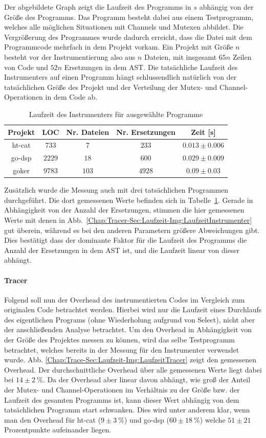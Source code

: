 Der abgebildete Graph zeigt die Laufzeit des Programms in $s$ abhängig von der 
Größe des Programms. Das Programm besteht dabei aus einem Testprogramm, welches 
alle möglichen Situationen mit Channels und Mutexen abbildet. Die Vergrößerung 
des Programmes wurde dadurch erreicht, dass die Datei mit dem Programmcode 
mehrfach in dem Projekt vorkam. Ein Projekt mit Größe $n$ besteht vor der 
Instrumentierung also 
aus $n$ Dateien, mit insgesamt $65n$ Zeilen von Code und $52n$ Ersetzungen
in dem AST. Die tatsächliche Laufzeit des Instrumenters auf einen 
Programm hängt schlussendlich natürlich von der tatsächlichen Größe des 
Projekt und der Verteilung der Mutex- und Channel-Operationen in dem Code ab.\\
\begin{table}[!h]
  \centering
  \begin{tabular}{|c|c|c|c|c|}
  \hline
  Projekt & LOC & Nr. Dateien & Nr. Ersetzungen & Zeit {[}s{]} \\ \hline
  ht-cat & $733$ & $7$ & $233$ & $0.013 \pm 0.006$ \\ \hline
  go-dsp & $2229$ & $18$ & $600$ & $0.029 \pm 0.009$ \\ \hline
  goker & $9783$ & $103$ & $4928$ & $0.09 \pm 0.03$ \\ \hline
  \end{tabular}
  \caption{Laufzeit des Instrumenters für ausgewählte Programme}
  \label{Chap:Tracer-Sec:Laufzeit-Tab:LaufzeitInstrumenter}
\end{table}
Zusätzlich wurde die Messung auch mit drei tatsächlichen Programmen 
durchgeführt. Die dort gemessenen Werte befinden sich in 
Tabelle~\ref{Chap:Tracer-Sec:Laufzeit-Tab:LaufzeitInstrumenter}. Gerade in 
Abhängigkeit von der Anzahl der Ersetzungen, stimmen die hier gemessenen Werte
mit denen in Abb.~\ref{Chap:Tracer-Sec:Laufzeit-Img:LaufzeitInstrumenter} gut 
überein, während es bei den anderen Parametern größere Abweichungen gibt.
Dies bestätigt dass der dominante Faktor für die Laufzeit des Programms 
die Anzahl der Ersetzungen in dem AST ist, und die Laufzeit linear von dieser 
abhängt.
\paragraph{Tracer} Folgend soll nun der Overhead des instrumentierten Codes 
im Vergleich zum originalen Code betrachtet werden.
Hierbei wird nur die Laufzeit eines Durchlaufs des eigentlichen Programs
(ohne Wiederholung aufgrund von Select), 
nicht aber der anschließenden 
Analyse betrachtet. Um den Overhead in Abhängigkeit von der Größe des Projektes messen 
zu können, wird das selbe Testprogramm betrachtet, welches bereits in der Messung 
für den Instrumenter verwendet wurde. Abb. \ref{Chap:Trace-Sec:Laufzeit-Img:LaufzeitTracer}
zeigt den gemessenen Overhead. Der durchschnittliche Overhead über alle gemessenen Werte 
liegt dabei bei $14 \pm 2\ \%$. Da der Overhead aber linear davon abhängt, 
wie groß der Anteil der Mutex- und Channel-Operationen im Verhältnis zu 
der Größe bzw. der Laufzeit des gesamten Programms ist, kann dieser Wert abhängig 
von dem tatsächlichen Programm start schwanken. Dies wird unter anderem klar, wenn man 
den Overhead für ht-cat ($9 \pm 3\ \%$) und go-dsp ($60\pm 18\ \%$) welche $51 \pm 21$ 
Prozentpunkte aufeinander liegen. 
